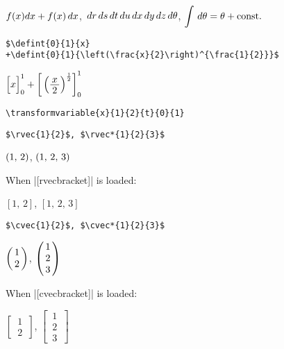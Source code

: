\documentclass[%
fleqn,%
paper=a4paper,%
fontsize=10pt,%
open_bracket_pos=zenkakunibu_nibu,%
hanging_punctuation,%
]%
{jlreq}
\makeatletter
\DeclareRobustCommand{\linesmash}{\@ifstar{\vspace{-\baselineskip}}{\vspace{-0.25\baselineskip}}}
\makeatother
\begin{document}
\begin{macroexample}
$f(x)dx+f(x)\,dx$, $\,dr\,ds\,dt\,du\,dx\,dy\,dz\,d\theta$,
$\displaystyle\int\,d\theta=\theta+\mathrm{const.}$
\end{macroexample}

\newpage
\begin{lstlisting}
$\defint{0}{1}{x}
+\defint{0}{1}{\left(\frac{x}{2}\right)^{\frac{1}{2}}}$
\end{lstlisting}

\begin{macroexample}
$\defint{0}{1}{x}
+\defint{0}{1}{\left(\frac{x}{2}\right)^{\frac{1}{2}}}$
\end{macroexample}

\begin{lstlisting}
\transformvariable{x}{1}{2}{t}{0}{1}
\end{lstlisting}

\begin{macroexample}
\end{macroexample}

\begin{lstlisting}
$\rvec{1}{2}$, $\rvec*{1}{2}{3}$
\end{lstlisting}

\begin{macroexample}
$\rvec{1}{2}$, $\rvec*{1}{2}{3}$
\end{macroexample}

\linesmash\linesmash
\indent\hspace*{0.14\textwidth}When |[rvecbracket]| is loaded:\\
\begin{macroexample}
$\left[1,\,2\right]$, $\left[1,\,2,\,3\right]$
\end{macroexample}

\begin{lstlisting}
$\cvec{1}{2}$, $\cvec*{1}{2}{3}$ 
\end{lstlisting}

\begin{macroexample}
$\cvec{1}{2}$, $\cvec*{1}{2}{3}$ 
\end{macroexample}

\linesmash\linesmash
\indent\hspace*{0.14\textwidth}When |[cvecbracket]| is loaded:\\
\begin{macroexample}
$\begin{bmatrix}\,1\,\\\,2\,\end{bmatrix}$, $\begin{bmatrix}\,1\,\\\,2\,\\\,3\,\end{bmatrix}$
\end{macroexample}
\end{document}
